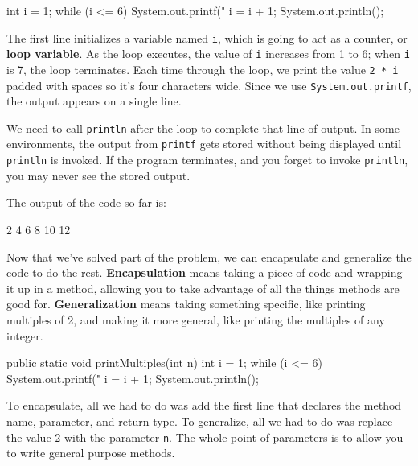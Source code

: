 \documentclass[12pt]{book}
\theoremstyle{exercise}
\begin{document}
\begin{code}
    int i = 1;
    while (i <= 6) {
        System.out.printf("%
        i = i + 1;
    }
    System.out.println();
\end{code}


The first line initializes a variable named {\tt i}, which is going to act as a counter, or {\bf loop variable}.
As the loop executes, the value of {\tt i} increases from 1 to 6; when {\tt i} is 7, the loop terminates.
Each time through the loop, we print the value {\tt 2 * i} padded with spaces so it's four characters wide.
Since we use {\tt System.out.printf}, the output appears on a single line.

We need to call {\tt println} after the loop to complete that line of output.
In some environments, the output from {\tt printf} gets stored without being displayed until {\tt println} is invoked.
If the program terminates, and you forget to invoke {\tt println}, you may never see the stored output.

The output of the code so far is:

\begin{stdout}
    2    4    6    8   10   12
\end{stdout}


Now that we've solved part of the problem, we can encapsulate and generalize the code to do the rest.
{\bf Encapsulation} means taking a piece of code and wrapping it up in a method, allowing you to take advantage of all the things methods are good for.
{\bf Generalization} means taking something specific, like printing multiples of 2, and making it more general, like printing the multiples of any integer.

\begin{code}
    public static void printMultiples(int n) {
        int i = 1;
        while (i <= 6) {
            System.out.printf("%
            i = i + 1;
        }
        System.out.println();
    }
\end{code}

To encapsulate, all we had to do was add the first line that declares the method name, parameter, and return type.
To generalize, all we had to do was replace the value 2 with the parameter {\tt n}.
The whole point of parameters is to allow you to write general purpose methods.
\end{document}
